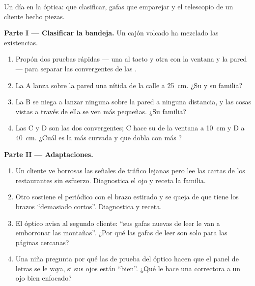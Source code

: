 \begin{problem}\label{pb:g8:lenses-images:1}
Un día en la óptica:  que clasificar, gafas que emparejar y el
telescopio de un cliente hecho piezas.

\medskip\noindent\textbf{Parte I --- Clasificar la bandeja.}
Un cajón volcado ha mezclado las existencias.
\begin{enumerate}
  \item Propón dos pruebas rápidas --- una al tacto y otra con la
        ventana y la pared --- para separar las convergentes de las
        .
  \item La  A lanza sobre la pared una 
        nítida de la calle a \qty{25}{cm}. ¿Su 
        y su familia?
  \item La  B se niega a lanzar ninguna 
        sobre la pared a ninguna distancia, y las cosas vistas a
        través de ella se ven más pequeñas. ¿Su familia?
  \item Las  C y D son las dos convergentes; C hace su
         de la ventana a \qty{10}{cm} y D a \qty{40}{cm}.
        ¿Cuál es la  más curvada y que dobla con más
        ?
\end{enumerate}

\medskip\noindent\textbf{Parte II --- Adaptaciones.}
\begin{enumerate}[resume]
  \item Un cliente ve borrosas las señales de tráfico lejanas pero
        lee las cartas de los restaurantes sin esfuerzo. Diagnostica
        el ojo y receta la familia.
  \item Otro sostiene el periódico con el brazo estirado y se queja
        de que tiene los brazos ``demasiado cortos''. Diagnostica y
        receta.
  \item El óptico avisa al segundo cliente: ``sus gafas nuevas de
        leer le van a emborronar las montañas''. ¿Por qué las gafas
        de leer son solo para las páginas cercanas?
  \item Una niña pregunta por qué las  de prueba del óptico
        hacen que el panel de letras se le vaya, si sus ojos están
        ``bien''. ¿Qué le hace una  correctora a un ojo
        bien enfocado?
\end{enumerate}


\end{problem}
